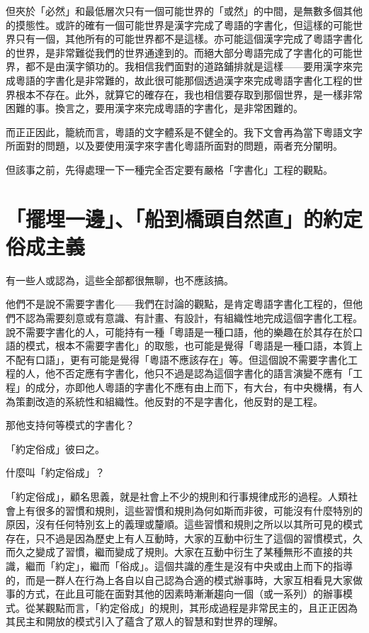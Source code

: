 \documentclass[a5paper, 10pt, openany]{book} %
\begin{document}
但夾於「必然」和最低層次只有一個可能世界的「或然」的中間，是無數多個其他的摸態性。或許的確有一個可能世界是漢字完成了粵語的字書化，但這樣的可能世界只有一個，其他所有的可能世界都不是這樣。亦可能這個漢字完成了粵語字書化的世界，是非常難從我們的世界通達到的。而絕大部分粵語完成了字書化的可能世界，都不是由漢字領功的。我相信我們面對的道路鋪排就是這樣——要用漢字來完成粵語的字書化是非常難的，故此很可能那個透過漢字來完成粵語字書化工程的世界根本不存在。此外，就算它的確存在，我也相信要存取到那個世界，是一樣非常困難的事。換言之，要用漢字來完成粵語的字書化，是非常困難的。 

而正正因此，籠統而言，粵語的文字體系是不健全的。我下文會再為當下粵語文字所面對的問題，以及要使用漢字來字書化粵語所面對的問題，兩者充分闡明。

但該事之前，先得處理一下一種完全否定要有嚴格「字書化」工程的觀點。

\section{「擺埋一邊」、「船到橋頭自然直」的約定俗成主義}

有一些人或認為，這些全部都很無聊，也不應該搞。

他們不是說不需要字書化——我們在討論的觀點，是肯定粵語字書化工程的，但他們不認為需要刻意或有意識、有計畫、有設計，有組織性地完成這個字書化工程。說不需要字書化的人，可能持有一種「粵語是一種口語，他的樂趣在於其存在於口語的模式，根本不需要字書化」的取態，也可能是覺得「粵語是一種口語，本質上不配有口語」，更有可能是覺得「粵語不應該存在」等。但這個說不需要字書化工程的人，他不否定應有字書化，他只不過是認為這個字書化的語言演變不應有「工程」的成分，亦即他人粵語的字書化不應有由上而下，有大台，有中央機構，有人為策劃改造的系統性和組織性。他反對的不是字書化，他反對的是工程。

那他支持何等模式的字書化？

「約定俗成」彼曰之。

什麼叫「約定俗成」？

「約定俗成」，顧名思義，就是社會上不少的規則和行事規律成形的過程。人類社會上有很多的習慣和規則，這些習慣和規則為何如斯而非彼，可能沒有什麼特別的原因，沒有任何特別玄上的義理或釐順。這些習慣和規則之所以以其所可見的模式存在，只不過是因為歷史上有人互動時，大家的互動中衍生了這個的習慣模式，久而久之變成了習慣，繼而變成了規則。大家在互動中衍生了某種無形不直接的共識，繼而「約定」，繼而「俗成」。這個共識的產生是沒有中央或由上而下的指導的，而是一群人在行為上各自以自己認為合適的模式辦事時，大家互相看見大家做事的方式，在此且可能在面對其他的因素時漸漸趨向一個（或一系列）的辦事模式。從某觀點而言，「約定俗成」的規則，其形成過程是非常民主的，且正正因為其民主和開放的模式引入了蘊含了眾人的智慧和對世界的理解。
\end{document}
